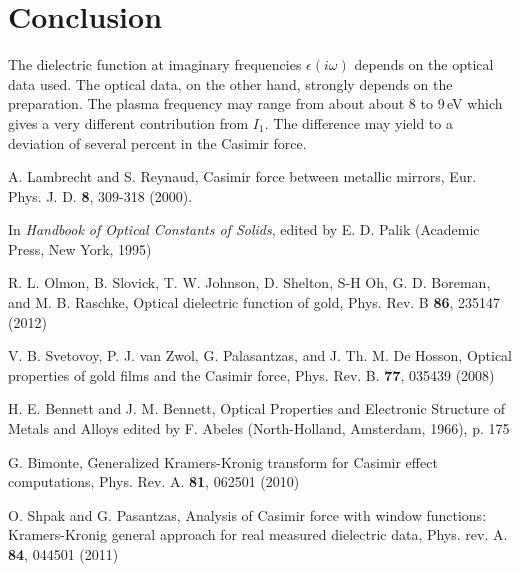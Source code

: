 \documentclass[twocolumn,superscriptaddress,pre]{revtex4-1}
\begin{document}
\section{Conclusion}

The dielectric function at imaginary frequencies $\epsilon(i\omega)$ depends on
the optical data used. The optical data, on the other hand, strongly depends on
the preparation. The plasma frequency may range from about about 8 to $9\,$eV
which gives a very different contribution from $I_1$. The difference may yield
to a deviation of several percent in the Casimir force.

\begin{thebibliography}{99}

A. Lambrecht and S. Reynaud,
Casimir force between metallic mirrors,
Eur. Phys. J. D. \textbf{8}, 309-318 (2000).

In \textit{Handbook of Optical Constants of Solids},
edited by E. D. Palik (Academic Press, New York, 1995)

R. L. Olmon, B. Slovick, T. W. Johnson, D. Shelton, S-H Oh, G. D. Boreman, and M. B. Raschke,
Optical dielectric function of gold,
Phys. Rev. B \textbf{86}, 235147 (2012)

V. B. Svetovoy, P. J. van Zwol, G. Palasantzas, and J. Th. M. De Hosson,
Optical properties of gold films and the Casimir force,
Phys. Rev. B. \textbf{77}, 035439 (2008)

H. E. Bennett and J. M. Bennett,
Optical Properties and Electronic Structure of Metals and Alloys edited by F. Abeles (North-Holland, Amsterdam, 1966), p. 175

G. Bimonte,
Generalized Kramers-Kronig transform for Casimir effect computations,
Phys. Rev. A. \textbf{81}, 062501 (2010)

O. Shpak and G. Pasantzas,
Analysis of Casimir force with window functions: Kramers-Kronig general approach for real measured dielectric data,
Phys. rev. A. \textbf{84}, 044501 (2011)

\end{thebibliography}
\end{document}

